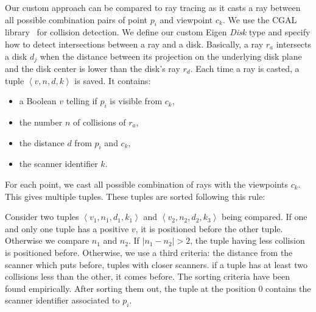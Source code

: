 Our custom approach can be compared to ray tracing as it casts a ray between all possible combination pairs of point $p_i$ and viewpoint $c_k$. We use the CGAL library~\cite{cgal} for collision detection. We define our custom Eigen \emph{Disk} type and specify how to detect intersections between a ray and a disk. Basically, a ray $r_a$ intersects a disk $d_j$ when the distance between its projection on the underlying disk plane and the disk center is lower than the
disk's ray $r_d$. Each time a ray is casted, a tuple $\left\langle v, n, d, k \right\rangle$ is saved. It contains:
\begin{itemize}
  \item a Boolean $v$ telling if $p_i$ is visible from $c_k$,
  \item the number $n$ of collisions of $r_a$,
  \item the distance $d$ from $p_i$ and $c_k$,
  \item the scanner identifier $k$.
\end{itemize}

For each point, we cast all possible combination of rays with the viewpoints $c_k$. This gives multiple tuples. These tuples are sorted following this rule:

Consider two tuples $\left\langle v_1, n_1, d_1, k_1 \right\rangle$ and $\left \langle v_2, n_2, d_2, k_3 \right\rangle$ being compared. If one and only one tuple has a positive $v$, it is positioned before the other tuple. Otherwise we compare $n_1$ and $n_2$. If $ | n_1 - n_2 | > 2 $, the tuple having less collision is positioned before. Otherwise, we use a third criteria: the distance from the scanner which puts before, tuples with closer scanners. if a tuple has at least two collisions less than the other, it comes before. The sorting criteria have been found empirically. After sorting them out, the tuple at the position $0$ contains the scanner identifier associated to $p_i$.

